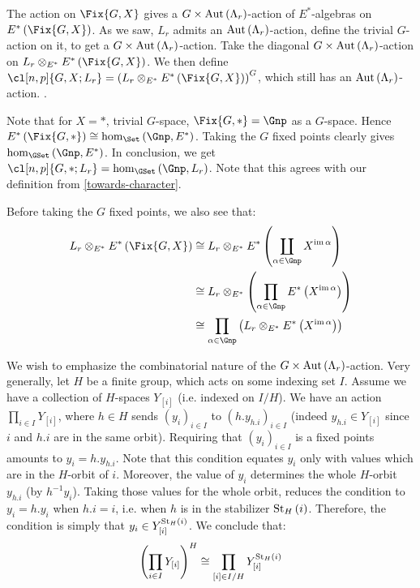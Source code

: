 The action on $\Fix{G,X}$ gives a $G \times \operatorname{Aut} \left(\Lambda_r\right)$-action of $E^*$-algebras on $E^*\left(\Fix{G,X}\right)$.
As we saw, $L_r$ admits an $\operatorname{Aut} \left(\Lambda_r\right)$-action, define the trivial $G$-action on it, to get a $G \times \operatorname{Aut} \left(\Lambda_r\right)$-action.
Take the diagonal $G \times \operatorname{Aut} \left(\Lambda_r\right)$-action on $L_r \otimes_{E^*} E^*\left(\Fix{G,X}\right)$.
We then define $\cl[n,p]{G,X; L_r} = \left(L_r \otimes_{E^*} E^*\left(\Fix{G,X}\right)\right)^G$, which still has an $\operatorname{Aut} \left(\Lambda_r\right)$-action.
.

Note that for $X = *$, trivial $G$-space, $\Fix{G,*} = \Gnp$ as a $G$-space.
Hence $E^*\left(\Fix{G,*}\right) \cong \hom_{\Set}\left(\Gnp, E^*\right)$.
Taking the $G$ fixed points clearly gives $\hom_{\GSet}\left(\Gnp, E^*\right)$.
In conclusion, we get $\cl[n,p]{G,*; L_r} =  \hom_{\GSet}\left(\Gnp, L_r\right)$.
Note that this agrees with our definition from \ref{towards-character}.

Before taking the $G$ fixed points, we also see that:
\begin{align}
	L_r \otimes_{E^*} E^*\left(\Fix{G,X}\right)
	&\cong L_r \otimes_{E^*} E^*\left(\coprod_{\alpha \in \Gnp} X^{\im \alpha}\right)\nonumber\\
	&\cong L_r \otimes_{E^*} \left(\prod_{\alpha \in \Gnp} E^*\left(X^{\im \alpha}\right)\right)\nonumber\\
	&\cong \prod_{\alpha \in \Gnp} \left(L_r \otimes_{E^*} E^*\left(X^{\im \alpha}\right)\right)\label{Lr-Fix}
\end{align}

We wish to emphasize the combinatorial nature of the $G \times \operatorname{Aut} \left(\Lambda_r\right)$-action.
Very generally, let $H$ be a finite group, which acts on some indexing set $I$.
Assume we have a collection of $H$-spaces $Y_{\left[i\right]}$ (i.e. indexed on $I/H$).
We have an action $\prod_{i \in I} Y_{\left[i\right]}$, where $h \in H$ sends $\left(y_i\right)_{i \in I}$ to $\left(h.y_{h.i}\right)_{i \in I}$ (indeed $y_{h.i} \in Y_{\left[i\right]}$ since $i$ and $h.i$ are in the same orbit).
Requiring that $\left(y_i\right)_{i \in I}$ is a fixed points amounts to $y_i = h.y_{h.i}$.
Note that this condition equates $y_i$ only with values which are in the $H$-orbit of $i$.
Moreover, the value of $y_i$ determines the whole $H$-orbit $y_{h.i}$ (by $h^{-1} y_i$).
Taking those values for the whole orbit, reduces the condition to $y_i = h. y_i$ when $h.i = i$, i.e. when $h$ is in the stabilizer $\operatorname{St}_H\left(i\right)$.
Therefore, the condition is simply that $y_i \in Y_{\left[i\right]}^{\operatorname{St}_H\left(i\right)}$.
We conclude that:
\begin{equation}\label{combinatorial-situation}
	\left(\prod_{i \in I} Y_{\left[i\right]}\right)^H
	\cong \prod_{\left[i\right] \in I/H} Y_{\left[i\right]}^{\operatorname{St}_H\left(i\right)}
\end{equation}

